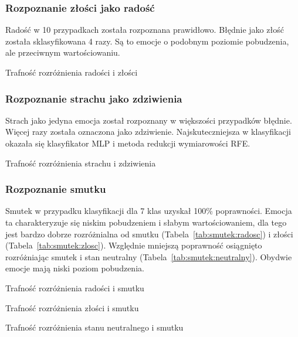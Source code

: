 \documentclass[a4paper,12pt,twoside,openany]{report}
\newcommand{\Tab}[1]{(Tabela~\ref{#1})}
\begin{document}
\subsubsection{Rozpoznanie złości jako radość}
Radość w 10 przypadkach została rozpoznana prawidłowo. 
Błędnie jako złość została sklasyfikowana 4 razy. 
Są to emocje o podobnym poziomie pobudzenia, ale przeciwnym wartościowaniu.
\begin{table}[hc!]
	\centering
	
	\caption{Trafność rozróżnienia radości i złości}
\end{table}
\subsubsection{Rozpoznanie strachu jako zdziwienia}
Strach jako jedyna emocja został rozpoznany w większości przypadków błędnie.
Więcej razy została oznaczona jako zdziwienie.
Najskuteczniejsza w klasyfikacji okazała się klasyfikator MLP i metoda redukcji wymiarowości RFE.
\begin{table}[hc!]
	\centering
	
	\caption{Trafność rozróżnienia strachu i zdziwienia}
\end{table}

\subsubsection{Rozpoznanie smutku}
Smutek w przypadku klasyfikacji dla 7 klas uzyskał 100\% poprawności. 
Emocja ta charakteryzuje się niskim pobudzeniem i słabym wartościowaniem,
dla tego jest bardzo dobrze rozróżnialna od smutku \Tab{tab:smutek:radosc} i złości \Tab{tab:smutek:zlosc}.
Względnie mniejszą poprawność osiągnięto rozróżniając smutek i stan neutralny \Tab{tab:smutek:neutralny}.
Obydwie emocje mają niski poziom pobudzenia.
\begin{table}[hc!]
	\centering
	
	\caption{Trafność rozróżnienia radości i smutku}
	\label{tab:smutek:radosc}
\end{table}
\begin{table}[hc!]
	\centering
	
	\caption{Trafność rozróżnienia złości i smutku}
	\label{tab:smutek:zlosc}
\end{table}
\begin{table}[hc!]
	\centering
	
	\caption{Trafność rozróżnienia stanu neutralnego i smutku}
	\label{tab:smutek:neutralny}
\end{table}
\end{document}
